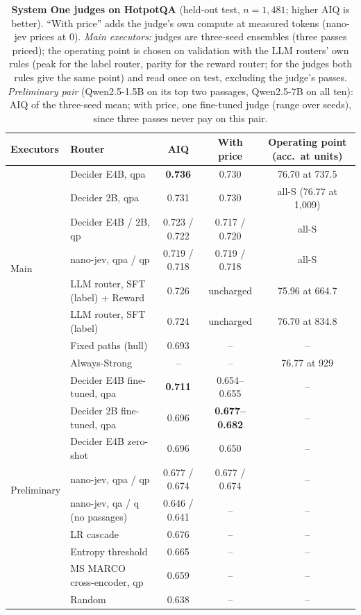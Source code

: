 \documentclass{article}
\newcommand{\Sg}{\textsc{S}}
\begin{document}
\begin{table}[h]
\caption{\textbf{System One judges on HotpotQA} (held-out test, $n{=}1{,}481$; higher AIQ is better). ``With price'' adds the judge's own compute at measured tokens (nano-jev prices at 0). \emph{Main executors:} judges are three-seed ensembles (three passes priced); the operating point is chosen on validation with the LLM routers' own rules (peak for the label router, parity for the reward router; for the judges both rules give the same point) and read once on test, excluding the judge's passes. \emph{Preliminary pair} (Qwen2.5-1.5B on its top two passages, Qwen2.5-7B on all ten): AIQ of the three-seed mean; with price, one fine-tuned judge (range over seeds), since three passes never pay on this pair.}
\label{tab:judges-hotpot}
\centering\small
\begin{tabular}{@{}llccc@{}}
\toprule
Executors & Router & AIQ & With price & Operating point (acc.\ at units)\\
\midrule
\multirow{8}{*}{Main} & Decider E4B, qpa & \textbf{0.736} & 0.730 & 76.70 at 737.5\\
& Decider 2B, qpa & 0.731 & 0.730 & all-\Sg{} (76.77 at 1,009)\\
& Decider E4B / 2B, qp & 0.723 / 0.722 & 0.717 / 0.720 & all-\Sg\\
& nano-jev, qpa / qp & 0.719 / 0.718 & 0.719 / 0.718 & all-\Sg\\
& LLM router, SFT (label) + Reward & 0.726 & uncharged & 75.96 at 664.7\\
& LLM router, SFT (label) & 0.724 & uncharged & 76.70 at 834.8\\
& Fixed paths (hull) & 0.693 & -- & --\\
& Always-Strong & -- & -- & 76.77 at 929\\
\midrule
\multirow{9}{*}{Preliminary} & Decider E4B fine-tuned, qpa & \textbf{0.711} & 0.654--0.655 & --\\
& Decider 2B fine-tuned, qpa & 0.696 & \textbf{0.677--0.682} & --\\
& Decider E4B zero-shot & 0.696 & 0.650 & --\\
& nano-jev, qpa / qp & 0.677 / 0.674 & 0.677 / 0.674 & --\\
& nano-jev, qa / q (no passages) & 0.646 / 0.641 & -- & --\\
& LR cascade & 0.676 & -- & --\\
& Entropy threshold & 0.665 & -- & --\\
& MS MARCO cross-encoder, qp & 0.659 & -- & --\\
& Random & 0.638 & -- & --\\
\bottomrule
\end{tabular}
\end{table}
\end{document}
